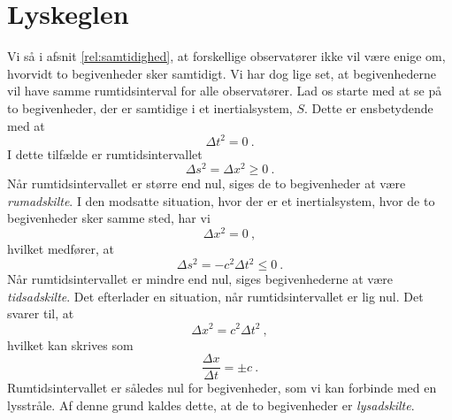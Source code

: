 



\section{Lyskeglen} \label{sec:Lyskeglen}
Vi så i afsnit \ref{rel:samtidighed}, at forskellige observatører ikke vil være enige om, hvorvidt to begivenheder sker samtidigt.
Vi har dog lige set, at begivenhederne vil have samme rumtidsinterval for alle observatører.
Lad os starte med at se på to begivenheder, der er samtidige i et inertialsystem, $S$.
Dette er ensbetydende med at 
$$
\Delta t^2=0 \: .
$$
I dette tilfælde er rumtidsintervallet
$$
\Delta s^2 = \Delta x^2\geq 0 \: .
$$
Når rumtidsintervallet er større end nul, siges de to begivenheder at være \emph{rumadskilte}.
I den modsatte situation, hvor der er et inertialsystem, hvor de to begivenheder sker samme sted, har vi
$$
\Delta x^2=0 \: ,
$$
hvilket medfører, at
$$
\Delta s^2=-c^2\Delta t^2\leq 0 \: .
$$
Når rumtidsintervallet er mindre end nul, siges begivenhederne at være \emph{tidsadskilte}.
Det efterlader en situation, når rumtidsintervallet er lig nul.
Det svarer til, at
$$
\Delta x^2=c^2\Delta t^2 \: ,
$$
hvilket kan skrives som
$$
\frac{\Delta x}{\Delta t}=\pm c \: .
$$
Rumtidsintervallet er således nul for begivenheder, som vi kan forbinde med en lysstråle.
Af denne grund kaldes dette, at de to begivenheder er \emph{lysadskilte}.

